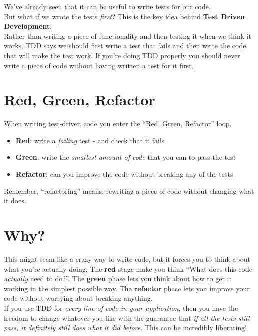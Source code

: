 We've already seen that it can be useful to write tests for our code.
\\

But what if we wrote the tests \textit{first}? This is the key idea behind \textbf{Test Driven Development}.
\\

Rather than writing a piece of functionality and then testing it when we think it works, TDD says we should first write a test that fails and then write the code that will make the test work. If you're doing TDD properly you should never write a piece of code without having written a test for it first.

\section{Red, Green, Refactor}

When writing test-driven code you enter the ``Red, Green, Refactor'' loop.

\begin{itemize}
    \item \textbf{Red}: write a \textit{failing} test - and check that it fails
    \item \textbf{Green}: write the \textit{smallest amount of code} that you can to pass the test
    \item \textbf{Refactor}: can you improve the code without breaking any of the tests
\end{itemize}

Remember, ``refactoring'' means: rewriting a piece of code without changing what it does.


\section{Why?}

This might seem like a crazy way to write code, but it forces you to think about what you're actually doing. The \textbf{red} stage make you think ``What does this code \textit{actually} need to do?''. The \textbf{green} phase lets you think about how to get it working in the simplest possible way. The \textbf{refactor} phase lets you improve your code without worrying about breaking anything.
\\

If you use TDD for \textit{every line of code in your application}, then you have the freedom to change whatever you like with the guarantee that \textit{if all the tests still pass, it definitely still does what it did before}. This can be incredibly liberating!
\\

